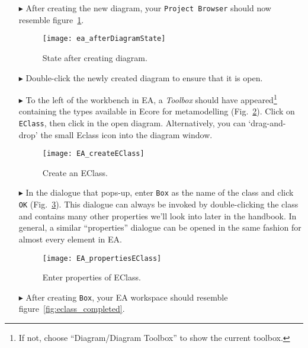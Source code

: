 \begin{itemize}
 
\item[$\blacktriangleright$] After creating the new diagram, your  \texttt{Project Browser} should now resemble figure~\ref{fig:diagram_completed}.

\begin{figure}[htbp]
	\centering
  \texttt{[image: ea\_afterDiagramState]}
	\caption{State after creating diagram.}
	\label{fig:diagram_completed}
\end{figure}



\item[$\blacktriangleright$] Double-click the newly created diagram to ensure that it is open.


\item[$\blacktriangleright$] To the left of the workbench in EA, a \emph{Toolbox} should have appeared\footnote{If not, choose ``Diagram/Diagram Toolbox'' to show the current toolbox.} containing the types available in Ecore for metamodelling (Fig.~\ref{fig:eclass}).
Click on \texttt{EClass}, then click in the open diagram. Alternatively, you can `drag-and-drop' the small Eclass icon into the diagram window.

\vspace{1cm}

\begin{figure}[htbp]
	\centering
  \texttt{[image: EA\_createEClass]}
	\caption{Create an EClass.}
	\label{fig:eclass}
\end{figure}

\vspace{1cm}


\item[$\blacktriangleright$] In the dialogue that pops-up, enter \texttt{Box} as the name of the class and click \texttt{OK} (Fig.~\ref{fig:eclass_properties}).
This dialogue can always be invoked by double-clicking the class and contains many other properties we'll look into later in the handbook.
In general, a similar ``properties'' dialogue can be opened in the same fashion for almost every element in EA.

\begin{figure}[htbp]
	\centering
  \texttt{[image: EA\_propertiesEClass]}
	\caption{Enter properties of EClass.}
	\label{fig:eclass_properties}
\end{figure}

\item[$\blacktriangleright$] After creating \texttt{Box}, your EA workspace should resemble figure~\ref{fig:eclass_completed}.


\end{itemize}
